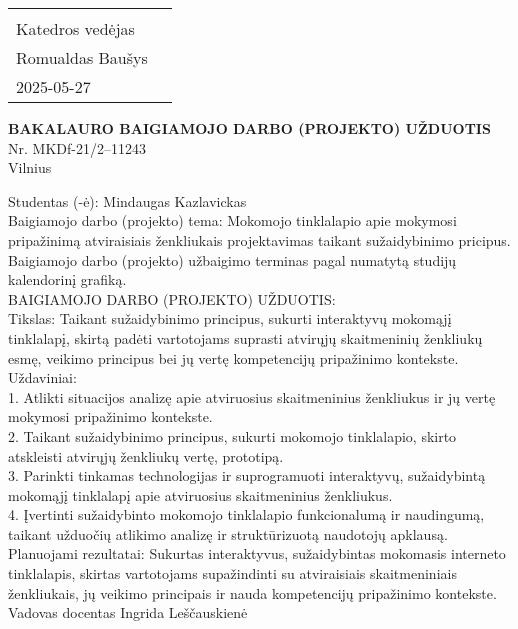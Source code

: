 {\begin{tabularx}{\textwidth}{Xc}
&
\begin{minipage}[t]{0.18\textwidth}
    {TVIRTINU}\\
    {Katedros vedėjas }\\
    {Romualdas Baušys}\\
    {2025-05-27}
\end{minipage}
\end{tabularx}
%
\vspace{4pt}
%
\begin{center}
{\textbf {BAKALAURO BAIGIAMOJO DARBO (PROJEKTO) UŽDUOTIS}}\\[0.5\baselineskip]
{Nr. MKDf-21/2–11243}\\
{Vilnius}\\
\end{center}
%
\noindent
{Studentas (-ė): Mindaugas Kazlavickas}\\[0.5\baselineskip]
%
\noindent
{Baigiamojo darbo (projekto) tema: Mokomojo tinklalapio apie mokymosi pripažinimą atviraisiais ženkliukais projektavimas taikant sužaidybinimo pricipus.}\\[0.5\baselineskip]
%
\noindent
{Baigiamojo darbo (projekto) užbaigimo terminas pagal numatytą studijų kalendorinį grafiką.}\\[1.0\baselineskip]
\noindent
{BAIGIAMOJO DARBO (PROJEKTO) UŽDUOTIS:}\\[0.5\baselineskip]
{Tikslas: Taikant sužaidybinimo principus, sukurti interaktyvų mokomąjį tinklalapį, skirtą padėti vartotojams suprasti atvirųjų skaitmeninių ženkliukų esmę, veikimo principus bei jų vertę kompetencijų pripažinimo kontekste.}\\[1.0\baselineskip]
Uždaviniai:\\[-0.2\baselineskip]
1. Atlikti situacijos analizę apie atviruosius skaitmeninius ženkliukus ir jų vertę mokymosi pripažinimo kontekste.\\[-0.2\baselineskip]
2. Taikant sužaidybinimo principus, sukurti mokomojo tinklalapio, skirto atskleisti atvirųjų ženkliukų vertę, prototipą.\\[-0.2\baselineskip]
3. Parinkti tinkamas technologijas ir suprogramuoti interaktyvų, sužaidybintą mokomąjį tinklalapį apie atviruosius skaitmeninius ženkliukus.\\[-0.2\baselineskip]
4. Įvertinti sužaidybinto mokomojo tinklalapio funkcionalumą ir naudingumą, taikant užduočių atlikimo analizę ir struktūrizuotą naudotojų apklausą.\\[0.5\baselineskip]
\noindent
{Planuojami rezultatai: Sukurtas interaktyvus, sužaidybintas mokomasis interneto tinklalapis, skirtas vartotojams supažindinti su atviraisiais skaitmeniniais ženkliukais, jų veikimo principais ir nauda kompetencijų pripažinimo kontekste.}\\[1.2\baselineskip]
\noindent
{Vadovas docentas Ingrida Leščauskienė}
}